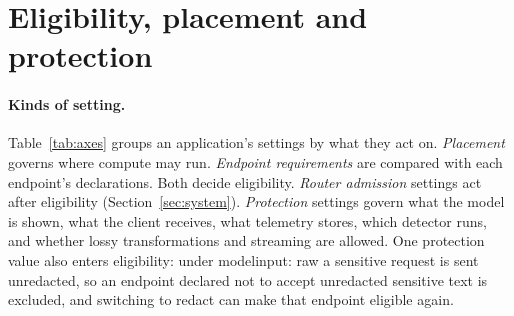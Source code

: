 \documentclass[11pt]{article}
\newcommand{\ubreak}{\textunderscore\allowbreak}
\newcommand{\code}[1]{{\ttfamily\let\_\ubreak #1}}
\begin{document}
\section{Eligibility, placement and protection}
\label{sec:eligibility}

\paragraph{Kinds of setting.} Table~\ref{tab:axes} groups an application's settings by what
they act on. \emph{Placement} governs where compute may run. \emph{Endpoint requirements} are
compared with each endpoint's declarations. Both decide eligibility. \emph{Router admission}
settings act after eligibility (Section~\ref{sec:system}). \emph{Protection} settings govern what
the model is shown, what the client receives, what telemetry stores, which detector runs, and
whether lossy transformations and streaming are allowed. One protection value also enters
eligibility: under \code{model\_input: raw} a sensitive request is sent unredacted, so an endpoint
declared not to accept unredacted sensitive text is excluded, and switching to \code{redact} can
make that endpoint eligible again.
\end{document}

